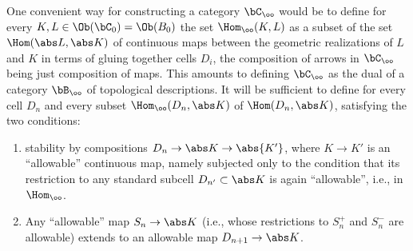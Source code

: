 %
\label{sec:11}%
One convenient way for constructing a category $\bC_\oo$ would be
to define for every $K,L\in\Ob(\bC_0) = \Ob(B_0)$ the set
$\Hom_\oo(K,L)$ as a subset of the set $\Hom(\abs L,\abs K)$ of
continuous maps between the geometric realizations of $L$ and $K$ in
terms of gluing together cells $D_i$, the composition of arrows in
$\bC_\oo$ being just composition of maps. This amounts to defining
$\bC_\oo$ as the dual of a category $\bB_\oo$ of topological
descriptions. It will be sufficient to define for every cell $D_n$ and
every subset $\Hom_\oo(D_n,\abs K)$ of $\Hom(D_n,\abs K)$, satisfying
the two conditions:
\begin{enumerate}[label=(\alph*)]
\item\label{it:11.a}
  stability by compositions $D_n \to \abs K \to \abs{K'}$, where $K\to
  K'$ is an ``allowable'' continuous map, namely subjected only to the
  condition that its restriction to any standard subcell $D_{n'}
  \subset \abs K$ is again ``allowable'', i.e., in $\Hom_\oo$.
\item\label{it:11.b}
  Any ``allowable'' map $S_n \to \abs K$ (i.e., whose restrictions to
  $S_n^+$ and $S_n^-$ are allowable) extends to an allowable map
  $D_{n+1}\to\abs K$.
\end{enumerate}

